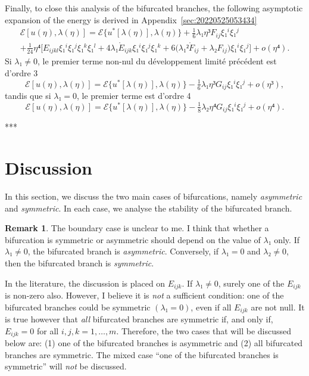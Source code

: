 \documentclass[12pt, final]{scrartcl}
\theoremstyle{definition}
\newtheorem{remark}{Remark}
\begin{document}
Finally, to close this analysis of the bifurcated branches, the following
asymptotic expansion of the energy is derived in
Appendix~\ref{sec:20220525053434}
\begin{multline}
  \label{eq:20220525053600}
    ℰ[u(η), λ(η)] = ℰ\{u^{\ast}[λ(η)], λ(η)\} + \tfrac{1}{6} λ₁ η³ F_{i j} ξ₁^i ξ₁^j\\
    +\tfrac{1}{24} η⁴ \bigl[E_{ijkl} ξ₁^i ξ₁^j ξ₁^k ξ₁^l + 4λ₁ \mathring{E}_{ijk} ξ₁^i ξ₁^j ξ₁^k + 6 \bigl(λ₁² \mathring{F}_{ij} + λ₂ F_{ij}\bigr) ξ₁^i ξ₁^j\bigr] + o(η⁴).
\end{multline}
Si \(λ₁ ≠ 0\), le premier terme non-nul du développement limité précédent est
d'ordre 3
\begin{equation}
 ℰ [u(η), λ(η)] = ℰ\{u^{\ast}[λ(η)], λ(η)\} - \tfrac{1}{6} λ₁ η³ G_{ij} ξ₁^i ξ₁^j + o(η³),
\end{equation}
tandis que si \(λ₁ = 0\), le premier terme est d'ordre 4 
\begin{equation}
 ℰ[u(η), λ(η)] = ℰ\{u^{\ast} [λ(η)], λ(η)\} - \tfrac{1}{8} λ₂ η⁴ G_{ij} ξ₁^i ξ₁^j + o(η⁴).
\end{equation}
\begin{center}
 ***
\end{center}

\section{Discussion}

In this section, we discuss the two main cases of bifurcations, namely
\emph{asymmetric} and \emph{symmetric}. In each case, we analyse the stability
of the bifurcated branch.

\begin{remark}
  The boundary case is unclear to me. I think that whether a bifurcation is
  symmetric or asymmetric should depend on the value of \(λ₁\) only. If
  \(λ₁ ≠ 0\), the bifurcated branch is \emph{asymmetric}. Conversely, if
  \(λ₁ = 0\) and \(λ₂ ≠ 0\), then the bifurcated branch is \emph{symmetric}.

  In the literature, the discussion is placed on \(E_{ijk}\). If \(λ₁ ≠ 0\),
  surely one of the \(E_{ijk}\) is non-zero also. However, I believe it is
  \emph{not} a sufficient condition: one of the bifurcated branches could be
  symmetric \((λ₁ = 0)\), even if all \(E_{ijk}\) are not null. It is true
  however that \emph{all} bifurcated branches are symmetric if, and only if,
  \(E_{ijk}=0\) for all \(i, j, k = 1, \ldots, m\). Therefore, the two cases
  that will be discussed below are: (1) one of the bifurcated branches is
  asymmetric and (2) all bifurcated branches are symmetric. The mixed case ``one
  of the bifurcated branches is symmetric'' will \emph{not} be discussed.
\end{remark}
\end{document}
